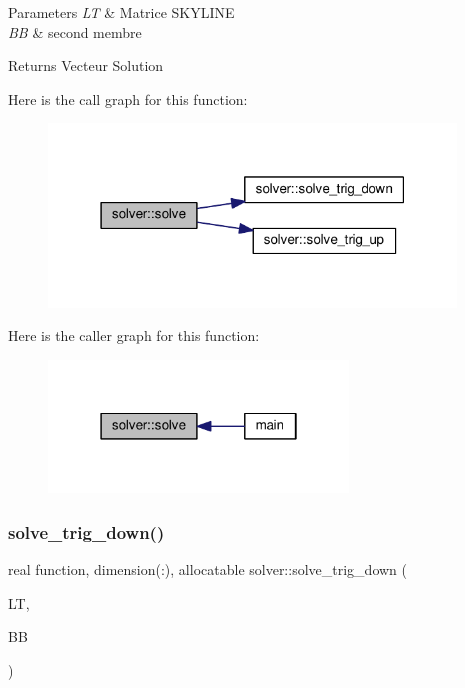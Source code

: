 \begin{DoxyParams}{Parameters}
{\em LT} & Matrice S\+K\+Y\+L\+I\+NE \\
\hline
{\em BB} & second membre \\
\hline
\end{DoxyParams}
\begin{DoxyReturn}{Returns}
Vecteur Solution 
\end{DoxyReturn}
Here is the call graph for this function\+:
\nopagebreak
\begin{figure}[H]
\begin{center}
\leavevmode
\includegraphics[width=307pt]{namespacesolver_af3691d2059a024a82bab7751a99e6006_cgraph}
\end{center}
\end{figure}
Here is the caller graph for this function\+:
\nopagebreak
\begin{figure}[H]
\begin{center}
\leavevmode
\includegraphics[width=226pt]{namespacesolver_af3691d2059a024a82bab7751a99e6006_icgraph}
\end{center}
\end{figure}
\mbox{\label{namespacesolver_ad8b8ef6c982475b3fb276f93660b750f}} 
\subsubsection{\texorpdfstring{solve\+\_\+trig\+\_\+down()}{solve\_trig\_down()}}
{\footnotesize\ttfamily real function, dimension(\+:), allocatable solver\+::solve\+\_\+trig\+\_\+down (\begin{DoxyParamCaption}\item[{type(skyline\+\_\+matrix)}]{LT,  }\item[{real, dimension(\+:), allocatable}]{BB }\end{DoxyParamCaption})}



